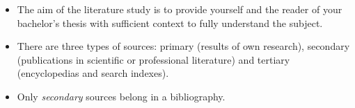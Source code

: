 \begin{itemize}
   \item The aim of the literature study is to provide yourself and the reader of your bachelor's thesis with sufficient context to fully understand the subject.
   \item There are three types of sources: primary (results of own research), secondary (publications in scientific or professional literature) and tertiary (encyclopedias and search indexes).
   \item Only \emph{secondary} sources belong in a bibliography.
\end{itemize}

